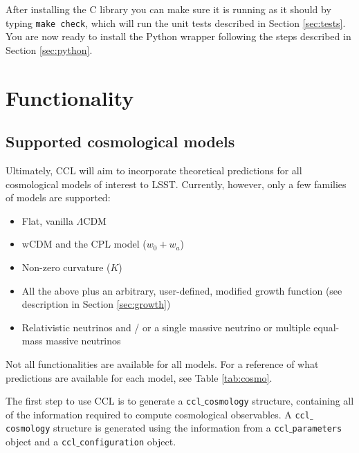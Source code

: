 \documentclass[\docopts]{\docclass}
\begin{document}
After installing the C library you can make sure it is running as it should by typing {\tt make check}, which will run the unit tests described in Section \ref{sec:tests}. You are now ready to install the Python wrapper following the steps described in Section \ref{sec:python}.

\section{Functionality}
\label{sec:func}

\subsection{Supported cosmological models}
\label{sec:cosmologies}
Ultimately, CCL will aim to incorporate theoretical predictions for all cosmological models of interest to LSST. Currently, however, only a few families of models are supported:
\begin{itemize}
 \item Flat, vanilla $\Lambda$CDM 
 \item wCDM and the CPL model ($w_0+w_a$)
 \item Non-zero curvature ($K$)
 \item All the above plus an arbitrary, user-defined, modified growth function (see description in Section \ref{sec:growth})
  \item Relativistic neutrinos and / or a single massive neutrino or multiple equal-mass massive neutrinos
\end{itemize}

Not all functionalities are available for all models. For a reference of what predictions are available for each model, see Table \ref{tab:cosmo}.

The first step to use CCL is to generate a {\tt ccl$\_$cosmology} structure, containing all of the information required to compute cosmological observables. A {\tt ccl$\_$cosmology} structure is generated using the information from a {\tt ccl$\_$parameters} object and a {\tt ccl$\_$configuration} object.


\end{document}
